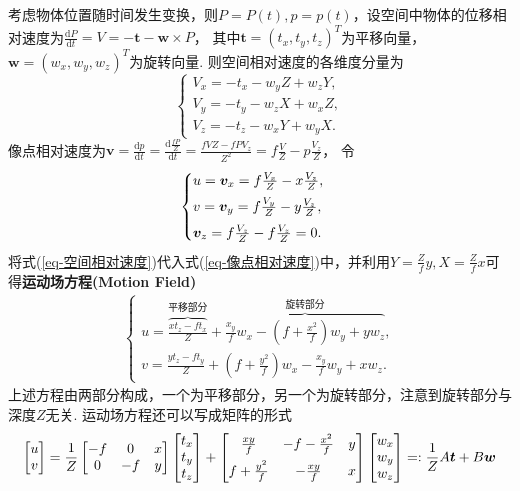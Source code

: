 \documentclass[12pt, a4paper, oneside]{ctexart}
\numberwithin{equation}{section}  %
\theoremstyle{definition}
\def\bd{\boldsymbol}        %
\def\d{\mathrm{d}}          %
\def\add{\vspace{1ex}}      %
\begin{document}
考虑物体位置随时间发生变换，则$P=P(t),p=p(t)$，设空间中物体的位移相对速度为$\frac{\d P}{\d t} = V = -\bd{t}-\bd{w}\times P$，
其中$\bd{t} = (t_x,t_y,t_z)^T$为平移向量，$\bd{w} = (w_x,w_y,w_z)^T$为旋转向量. \add 
则空间相对速度的各维度分量为
\begin{equation}
    \label{eq-空间相对速度}
    \begin{cases}
        V_x = -t_x - w_yZ+w_zY,\\
        V_y = -t_y - w_zX + w_xZ,\\
        V_z = -t_z - w_xY + w_yX.
    \end{cases}
\end{equation}
像点相对速度为$\bd{v} = \frac{\d p}{\d t} = \frac{\d\frac{fP}{Z}}{\d t} = \frac{fVZ-fPV_z}{Z^2} = f\frac{V}{Z}-p\frac{V_z}{Z}$，
令
\begin{equation}
    \label{eq-像点相对速度}
    \begin{cases}
        u = \bd{v}_x = f\frac{V_x}{Z} - x\frac{V_z}{Z},\add\\
        v = \bd{v}_y = f\frac{V_y}{Z} - y\frac{V_z}{Z},\add\\
        \bd{v}_z = f\frac{V_z}{Z} - f\frac{V_z}{Z} = 0.
    \end{cases}
\end{equation}
将式(\ref{eq-空间相对速度})代入式(\ref{eq-像点相对速度})中，并利用$Y = \frac{Z}{f}y,X=\frac{Z}{f}x$可得\textbf{运动场方程(Motion Field)}
\begin{align*}
    \begin{cases}
        u = \overbrace{\frac{xt_z-ft_x}{Z}}^{\text{平移部分}}+\overbrace{\frac{x_y}{f}w_x - (f+\frac{x^2}{f})w_y+yw_z}^{\text{旋转部分}},\\
        v = \frac{yt_z-ft_y}{Z}+(f+\frac{y^2}{f})w_x-\frac{x_y}{f}w_y+xw_z.
    \end{cases}
\end{align*}
上述方程由两部分构成，一个为平移部分，另一个为旋转部分，注意到旋转部分与深度$Z$无关. 运动场方程还可以写成矩阵的形式
\begin{equation*}
    \begin{bmatrix}
        u\\v
    \end{bmatrix} = \frac{1}{Z}\begin{bmatrix}
        -f&0&x\\0&-f&y
    \end{bmatrix}\begin{bmatrix}
        t_x\\t_y\\t_z
    \end{bmatrix}+\begin{bmatrix}
        \frac{xy}{f}&-f-\frac{x^2}{f}&y\add\\
        f+\frac{y^2}{f}&-\frac{xy}{f}&x
    \end{bmatrix}\begin{bmatrix}
        w_x\\w_y\\w_z
    \end{bmatrix} =: \frac{1}{Z}A\bd{t} + B\bd{w}
\end{equation*}
\end{document}

